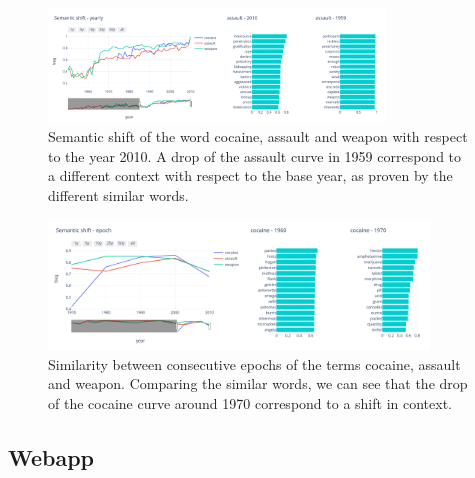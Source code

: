 \begin{figure}
\begin{center}
  \includegraphics[width=0.8\textwidth]{images/semantic_2.png}
  \caption{Semantic shift of the word cocaine, assault and weapon 
  with respect to the year 2010. A drop of the assault curve in 1959 correspond to 
  a different context with respect to the base year, as proven by the different similar words.} \label{fig2}
\end{center}
\end{figure}

\begin{figure}
  \begin{center}
    \includegraphics[width=0.9\textwidth]{images/semantic_1.png}
    \caption{Similarity between consecutive epochs of the terms cocaine, assault and weapon. Comparing 
    the similar words, we can see that the drop of the cocaine curve around 1970 correspond to a shift in context.} \label{fig3}
  \end{center}
\end{figure}

\subsection{Webapp}


